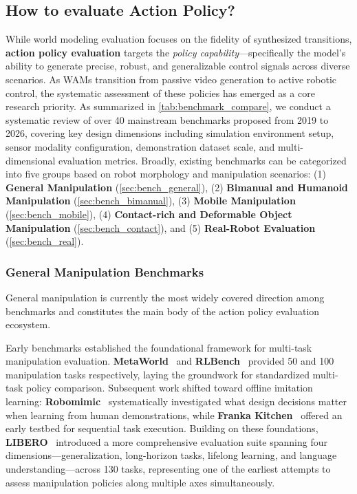 

\subsection{How to evaluate Action Policy?}
\label{sec:eval_action}

While world modeling evaluation focuses on the fidelity of synthesized transitions, \textbf{action policy evaluation} targets the \textit{policy capability}—specifically the model's ability to generate precise, robust, and generalizable control signals across diverse scenarios. As WAMs transition from passive video generation to active robotic control, the systematic assessment of these policies has emerged as a core research priority. 
As summarized in \autoref{tab:benchmark_compare}, we conduct a systematic review of over 40 mainstream benchmarks proposed from 2019 to 2026, covering key design dimensions including simulation environment setup, sensor modality configuration, demonstration dataset scale, and multi-dimensional evaluation metrics. Broadly, existing benchmarks can be categorized into five groups based on robot morphology and manipulation scenarios: (1) \textbf{General Manipulation} (\autoref{sec:bench_general}), (2) \textbf{Bimanual and Humanoid Manipulation} (\autoref{sec:bench_bimanual}), (3) \textbf{Mobile Manipulation} (\autoref{sec:bench_mobile}), (4) \textbf{Contact-rich and Deformable Object Manipulation} (\autoref{sec:bench_contact}), and (5) \textbf{Real-Robot Evaluation} (\autoref{sec:bench_real}).


\subsubsection{General Manipulation Benchmarks}
\label{sec:bench_general}
General manipulation is currently the most widely covered direction among benchmarks and
constitutes the main body of the action policy evaluation ecosystem.

Early benchmarks established the foundational framework for multi-task manipulation evaluation. \textbf{MetaWorld}~\cite{yu2019metaworld} and \textbf{RLBench}~\cite{RLBench} provided 50 and 100 manipulation tasks respectively, laying the groundwork for standardized multi-task policy comparison. Subsequent work shifted toward offline imitation learning: \textbf{Robomimic}~\cite{mandlekar2021robomimic} systematically investigated what design decisions matter when learning from human demonstrations, while \textbf{Franka Kitchen}~\cite{gupta2019relay} offered an early testbed for sequential task execution. Building on these foundations, \textbf{LIBERO}~\cite{LIBERO} introduced a more comprehensive evaluation suite spanning four dimensions—generalization, long-horizon tasks, lifelong learning, and language understanding—across 130 tasks, representing one of the earliest attempts to assess manipulation policies along multiple axes simultaneously.

